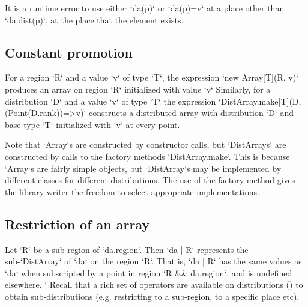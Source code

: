 It is a runtime error to use either \xcd`da(p)` or \xcd`da(p)=v` at a place
other than \xcd`da.dist(p)`, \viz{} at the place that the element exists. 


\subsection{Constant promotion}\label{ConstantArray}

For a region \xcd`R` and a value \xcd`v` of type \xcd`T`, the expression 
\xcd`new Array[T](R, v)` 
produces an array on region \xcd`R` initialized with value \xcd`v`
Similarly, 
for a distribution \xcd`D` and a value \xcd`v` of
type \xcd`T` the expression 
\xcd`DistArray.make[T](D, (Point(D.rank))=>v)`
constructs a distributed array with
distribution \xcd`D` and base type \xcd`T` initialized with \xcd`v`
at every point.

Note that \xcd`Array`s are constructed by constructor calls, but
\xcd`DistArrays` are constructed by calls to the factory methods
\xcd`DistArray.make`. This is because \xcd`Array`s are fairly simple objects,
but \xcd`DistArray`s may be implemented by different classes for different
distributions. The use of the factory method gives the library writer the
freedom to select appropriate implementations.


\subsection{Restriction of an array}

Let \xcd`R` be a sub-region of \xcd`da.region`. Then 
\xcd`da | R`
represents the sub-\xcd`DistArray` of \xcd`da` on the region \xcd`R`.
That is, \xcd`da | R` has the same values as \xcd`da` when subscripted by a
point in region \xcd`R && da.region`, and is undefined elsewhere.
`
Recall that a rich set of operators are available on distributions
() to obtain sub-distributions
(e.g. restricting to a sub-region, to a specific place etc).

